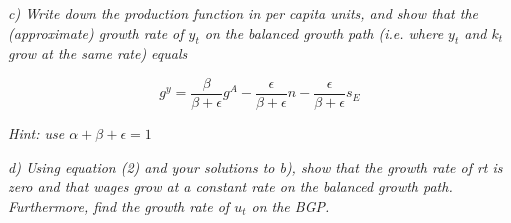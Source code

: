 \documentclass[11pt]{article} %
\begin{document}
\pagebreak

\noindent\textit{c) Write down the production function in per capita units, and show that
the (approximate) growth rate of $y_t$ on the balanced growth path (i.e.
where $y_t$ and $k_t$ grow at the same rate) equals}\par

\begin{equation}
    g^y=\frac{\beta}{\beta+\epsilon}{g^A}-\frac{\epsilon}{\beta+\epsilon}{n}-\frac{\epsilon}{\beta+\epsilon}{s_E}
\end{equation}

\noindent\textit{Hint: use $\alpha+\beta+\epsilon=1$}



\noindent\textit{d) Using equation (2) and your solutions to b), show that the growth rate of
rt is zero and that wages grow at a constant rate on the balanced growth
path. Furthermore, find the growth rate of $u_t$ on the BGP.}\par
\end{document}
